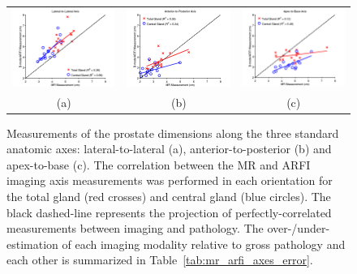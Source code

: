 \begin{figure}
\centering
\begin{tabular}{ccc}
\includegraphics[width=0.3\linewidth]{figs/Imaging_Lateral-to-Lateral} &
\includegraphics[width=0.3\linewidth]{figs/Imaging_Anterior-to-Posterior} &
\includegraphics[width=0.3\linewidth]{figs/Imaging_Apex-to-Base} \\
(a) & (b) & (c) \\
\end{tabular}
\caption{Measurements of the prostate dimensions along the three standard
    anatomic axes: lateral-to-lateral (a), anterior-to-posterior (b) and
    apex-to-base (c).  The correlation between the MR and ARFI imaging axis
    measurements was performed in each orientation for the total gland (red
    crosses) and central gland (blue circles).  The black dashed-line represents
    the projection of perfectly-correlated measurements between imaging and
    pathology.  The over-/under-estimation of each imaging modality relative to
    gross pathology and each other is summarized in
    Table~\ref{tab:mr_arfi_axes_error}.} 
\label{fig:mr_arfi_path_axes}
\end{figure}
